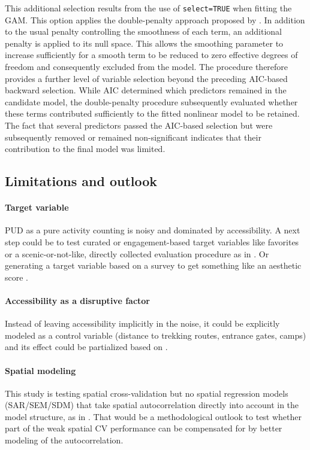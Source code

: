 \documentclass[11pt]{article}
\renewcommand{\_}{\textunderscore\allowbreak{}}
\begin{document}
This additional selection results from the use of \texttt{select=TRUE} when fitting the GAM. This option applies the double-penalty approach proposed by \citet{marra_practical_2011}. In addition to the usual penalty controlling the smoothness of each term, an additional penalty is applied to its null space. This allows the smoothing parameter to increase sufficiently for a smooth term to be reduced to zero effective degrees of freedom and consequently excluded from the model. The procedure therefore provides a further level of variable selection beyond the preceding AIC-based backward selection. While AIC determined which predictors remained in the candidate model, the double-penalty procedure subsequently evaluated whether these terms contributed sufficiently to the fitted nonlinear model to be retained. The fact that several predictors passed the AIC-based selection but were subsequently removed or remained non-significant indicates that their contribution to the final model was limited.

\subsection{Limitations and outlook}
\paragraph{Target variable}
PUD as a pure activity counting is noisy and dominated by accessibility. A next step could be to test curated or engagement-based target variables like favorites \citep{despotovic_beautiful_2025} or a scenic-or-not-like, directly collected evaluation procedure as in \citet{havinga_social_2021}. Or generating a target variable based on a survey to get something like an aesthetic score \citep{schirpke_predicting_2013}. 
\paragraph{Accessibility as a disruptive factor}
Instead of leaving accessibility implicitly in the noise, it could be explicitly modeled as a control variable (distance to trekking routes, entrance gates, camps) and its effect could be partialized based on \citet{langemeyer_mapping_2018}. 
\paragraph{Spatial modeling}
This study is testing spatial cross-validation but no spatial regression models (SAR/SEM/SDM) that take spatial autocorrelation directly into account in the model structure, as in \citet{despotovic_beautiful_2025}. That would be a methodological outlook to test whether part of the weak spatial CV performance can be compensated for by better modeling of the autocorrelation. 
\end{document}
